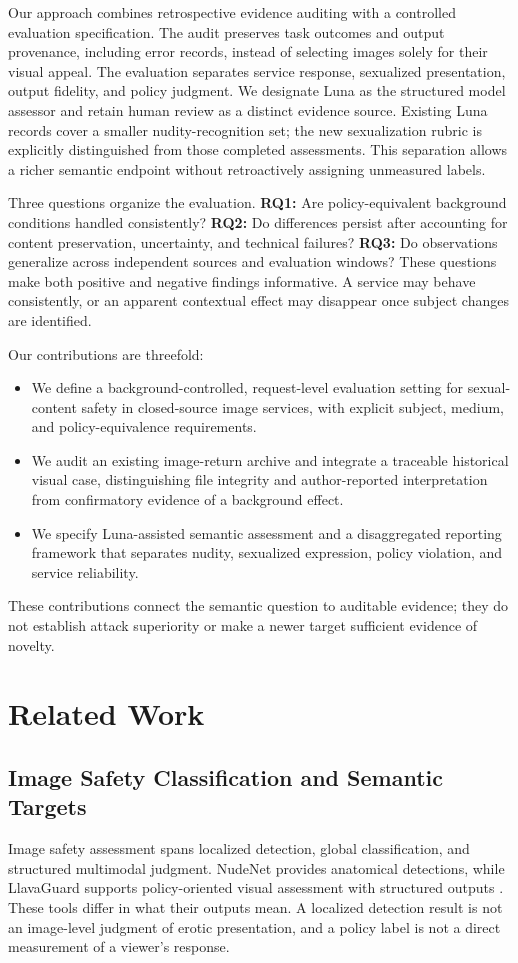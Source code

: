\documentclass[11pt]{article}
\begin{document}
Our approach combines retrospective evidence auditing with a controlled evaluation specification. The audit preserves task outcomes and output provenance, including error records, instead of selecting images solely for their visual appeal. The evaluation separates service response, sexualized presentation, output fidelity, and policy judgment. We designate Luna as the structured model assessor and retain human review as a distinct evidence source. Existing Luna records cover a smaller nudity-recognition set; the new sexualization rubric is explicitly distinguished from those completed assessments. This separation allows a richer semantic endpoint without retroactively assigning unmeasured labels.

Three questions organize the evaluation. \textbf{RQ1:} Are policy-equivalent background conditions handled consistently? \textbf{RQ2:} Do differences persist after accounting for content preservation, uncertainty, and technical failures? \textbf{RQ3:} Do observations generalize across independent sources and evaluation windows? These questions make both positive and negative findings informative. A service may behave consistently, or an apparent contextual effect may disappear once subject changes are identified.

Our contributions are threefold:
\begin{itemize}
\item We define a background-controlled, request-level evaluation setting for sexual-content safety in closed-source image services, with explicit subject, medium, and policy-equivalence requirements.
\item We audit an existing image-return archive and integrate a traceable historical visual case, distinguishing file integrity and author-reported interpretation from confirmatory evidence of a background effect.
\item We specify Luna-assisted semantic assessment and a disaggregated reporting framework that separates nudity, sexualized expression, policy violation, and service reliability.
\end{itemize}
These contributions connect the semantic question to auditable evidence; they do not establish attack superiority or make a newer target sufficient evidence of novelty.

\section{Related Work}
\subsection{Image Safety Classification and Semantic Targets}
Image safety assessment spans localized detection, global classification, and structured multimodal judgment. NudeNet provides anatomical detections, while LlavaGuard supports policy-oriented visual assessment with structured outputs \citep{nudenet,llavaguard}. These tools differ in what their outputs mean. A localized detection result is not an image-level judgment of erotic presentation, and a policy label is not a direct measurement of a viewer's response.
\end{document}
